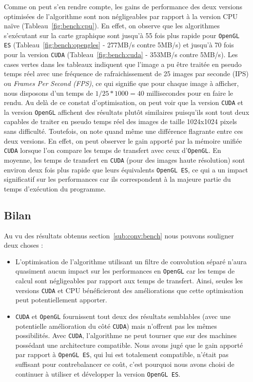 Comme on peut s'en rendre compte, les gains de performance des deux versions optimisées de l'algorithme sont non négligeables par rapport à la version CPU naïve (Tableau~\ref{fig:bench:cpu}). En effet, on observe que les algorithmes s'exécutant sur la carte graphique sont jusqu'à 55 fois plus rapide pour \texttt{OpenGL ES} (Tableau~\ref{fig:bench:opengles} - 277MB/s contre 5MB/s) et jusqu'à 70 fois pour la version \texttt{CUDA} (Tableau~\ref{fig:bench:cuda} - 353MB/s contre 5MB/s). Les cases vertes dans les tableaux indiquent que l'image a pu être traitée en pseudo temps réel avec une fréquence de rafraichissement de 25 images par seconde (IPS) ou \emph{Frames Per Second (FPS)}, ce qui signifie que pour chaque image à afficher, nous disposons d'un temps de $1/25 * 1000 = 40$ millisecondes pour en faire le rendu. Au delà de ce constat d'optimisation, on peut voir que la version \texttt{CUDA} et la version \texttt{OpenGL} affichent des résultats plutôt similaires puisqu'ils sont tout deux capables de traiter en pseudo temps réel des images de taille 1024x1024 pixels sans difficulté. Toutefois, on note quand même une différence flagrante entre ces deux versions. En effet, on peut observer le gain apporté par la mémoire unifiée \texttt{CUDA} lorsque l'on compare les temps de transfert avec ceux d'\texttt{OpenGL}. En moyenne, les temps de transfert en \texttt{CUDA} (pour des images haute résolution) sont environ deux fois plus rapide que leurs équivalents \texttt{OpenGL ES}, ce qui a un impact significatif sur les performances car ils correspondent à la majeure partie du temps d'exécution du programme.

\subsection{Bilan}
Au vu des résultats obtenus section~\ref{sub:conv:bench} nous pouvons souligner deux choses :
\begin{itemize}
\item L'optimisation de l'algorithme utilisant un filtre de convolution séparé n'aura quasiment aucun impact sur les performances en \texttt{OpenGL} car les temps de calcul sont négligeables par rapport aux temps de transfert. Ainsi, seules les versions \texttt{CUDA} et CPU bénéficieront des améliorations que cette optimisation peut potentiellement apporter.
\item \texttt{CUDA} et \texttt{OpenGL} fournissent tout deux des résultats semblables (avec une potentielle amélioration du côté \texttt{CUDA}) mais n'offrent pas les mêmes possibilités. Avec \texttt{CUDA}, l'algorithme ne peut tourner que sur des machines possédant une architecture compatible. Nous avons jugé que le gain apporté par rapport à \texttt{OpenGL ES}, qui lui est totalement compatible, n'était pas suffisant pour contrebalancer ce coût, c'est pourquoi nous avons choisi de continuer à utiliser et développer la version \texttt{OpenGL ES}.
\end{itemize}

